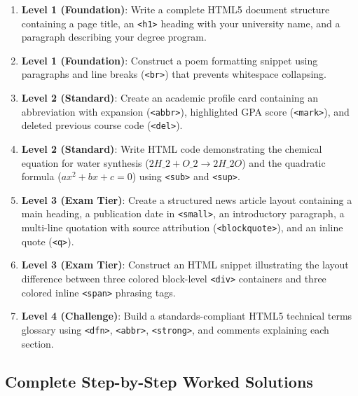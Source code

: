 \begin{practiceset}
\begin{enumerate}[leftmargin=1.5em]
    \item \textbf{Level 1 (Foundation)}: Write a complete HTML5 document structure containing a page title, an \texttt{<h1>} heading with your university name, and a paragraph describing your degree program.
    \item \textbf{Level 1 (Foundation)}: Construct a poem formatting snippet using paragraphs and line breaks (\texttt{<br>}) that prevents whitespace collapsing.
    \item \textbf{Level 2 (Standard)}: Create an academic profile card containing an abbreviation with expansion (\texttt{<abbr>}), highlighted GPA score (\texttt{<mark>}), and deleted previous course code (\texttt{<del>}).
    \item \textbf{Level 2 (Standard)}: Write HTML code demonstrating the chemical equation for water synthesis ($2H\_2 + O\_2 \to 2H\_2O$) and the quadratic formula ($ax^2 + bx + c = 0$) using \texttt{<sub>} and \texttt{<sup>}.
    \item \textbf{Level 3 (Exam Tier)}: Create a structured news article layout containing a main heading, a publication date in \texttt{<small>}, an introductory paragraph, a multi-line quotation with source attribution (\texttt{<blockquote>}), and an inline quote (\texttt{<q>}).
    \item \textbf{Level 3 (Exam Tier)}: Construct an HTML snippet illustrating the layout difference between three colored block-level \texttt{<div>} containers and three colored inline \texttt{<span>} phrasing tags.
    \item \textbf{Level 4 (Challenge)}: Build a standards-compliant HTML5 technical terms glossary using \texttt{<dfn>}, \texttt{<abbr>}, \texttt{<strong>}, and comments explaining each section.
\end{enumerate}
\end{practiceset}

\subsection{Complete Step-by-Step Worked Solutions}

